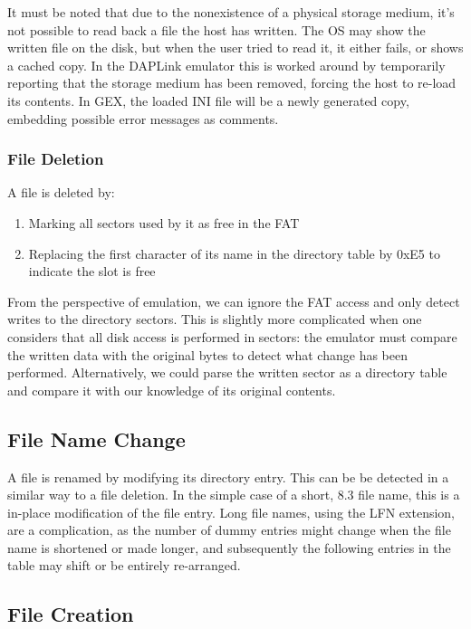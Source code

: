 It must be noted that due to the nonexistence of a physical storage medium, it's not possible to read back a file the host has written. The \gls{OS} may show the written file on the disk, but when the user tried to read it, it either fails, or shows a cached copy. In the DAPLink emulator this is worked around by temporarily reporting that the storage medium has been removed, forcing the host to re-load its contents. In GEX, the loaded INI file will be a newly generated copy, embedding possible error messages as comments.

\subsubsection{File Deletion}

A file is deleted by:

\begin{enumerate}
	\item Marking all sectors used by it as free in the \gls{FAT}
	\item Replacing the first character of its name in the directory table by 0xE5 to indicate the slot is free
\end{enumerate}

From the perspective of emulation, we can ignore the \gls{FAT} access and only detect writes to the directory sectors. This is slightly more complicated when one considers that all disk access is performed in sectors: the emulator must compare the written data with the original bytes to detect what change has been performed. Alternatively, we could parse the written sector as a directory table and compare it with our knowledge of its original contents.

\subsection{File Name Change}

A file is renamed by modifying its directory entry. This can be be detected in a similar way to a file deletion. In the simple case of a short, 8.3 file name, this is a in-place modification of the file entry. Long file names, using the \gls{LFN} extension, are a complication, as the number of dummy entries might change when the file name is shortened or made longer, and subsequently the following entries in the table may shift or be entirely re-arranged.

\subsection{File Creation}

